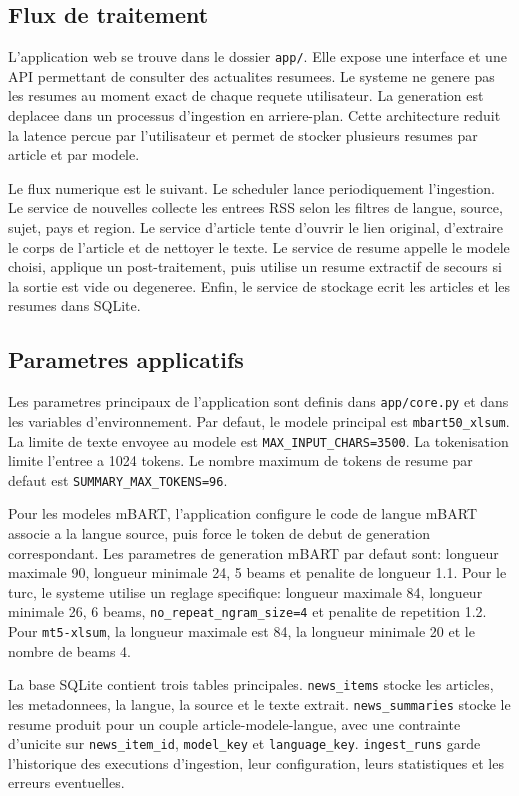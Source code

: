 \subsection{Flux de traitement}

L'application web se trouve dans le dossier \texttt{app/}. Elle expose une interface et une API permettant de consulter des actualites resumees. Le systeme ne genere pas les resumes au moment exact de chaque requete utilisateur. La generation est deplacee dans un processus d'ingestion en arriere-plan. Cette architecture reduit la latence percue par l'utilisateur et permet de stocker plusieurs resumes par article et par modele.

Le flux numerique est le suivant. Le scheduler lance periodiquement l'ingestion. Le service de nouvelles collecte les entrees RSS selon les filtres de langue, source, sujet, pays et region. Le service d'article tente d'ouvrir le lien original, d'extraire le corps de l'article et de nettoyer le texte. Le service de resume appelle le modele choisi, applique un post-traitement, puis utilise un resume extractif de secours si la sortie est vide ou degeneree. Enfin, le service de stockage ecrit les articles et les resumes dans SQLite.

\subsection{Parametres applicatifs}

Les parametres principaux de l'application sont definis dans \texttt{app/core.py} et dans les variables d'environnement. Par defaut, le modele principal est \texttt{mbart50\_xlsum}. La limite de texte envoyee au modele est \texttt{MAX\_INPUT\_CHARS=3500}. La tokenisation limite l'entree a 1024 tokens. Le nombre maximum de tokens de resume par defaut est \texttt{SUMMARY\_MAX\_TOKENS=96}.

Pour les modeles mBART, l'application configure le code de langue mBART associe a la langue source, puis force le token de debut de generation correspondant. Les parametres de generation mBART par defaut sont: longueur maximale 90, longueur minimale 24, 5 beams et penalite de longueur 1.1. Pour le turc, le systeme utilise un reglage specifique: longueur maximale 84, longueur minimale 26, 6 beams, \texttt{no\_repeat\_ngram\_size=4} et penalite de repetition 1.2. Pour \texttt{mt5-xlsum}, la longueur maximale est 84, la longueur minimale 20 et le nombre de beams 4.

La base SQLite contient trois tables principales. \texttt{news\_items} stocke les articles, les metadonnees, la langue, la source et le texte extrait. \texttt{news\_summaries} stocke le resume produit pour un couple article-modele-langue, avec une contrainte d'unicite sur \texttt{news\_item\_id}, \texttt{model\_key} et \texttt{language\_key}. \texttt{ingest\_runs} garde l'historique des executions d'ingestion, leur configuration, leurs statistiques et les erreurs eventuelles.

